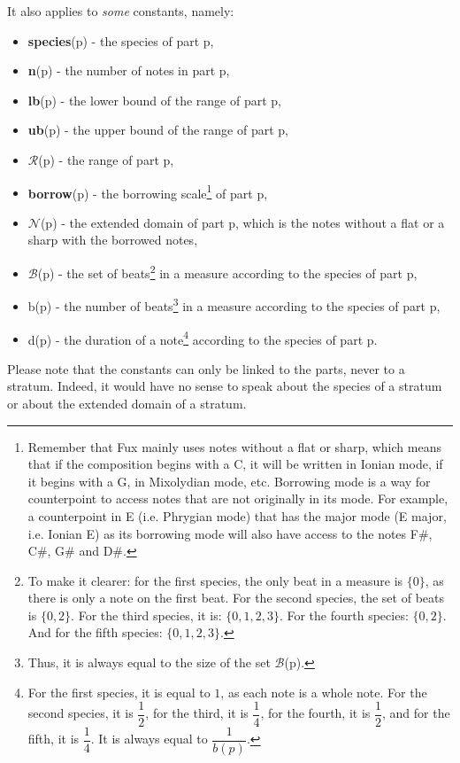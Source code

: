 \noindent It also applies to \textit{some} constants, namely:
\begin{itemize}
    \item \textbf{species}(p) - the species of part p,
    \item \textbf{n}(p) - the number of notes in part p,
    \item \textbf{lb}(p) - the lower bound of the range of part p,
    \item \textbf{ub}(p) - the upper bound of the range of part p,
    \item $\mathcal{R}$(p) - the range of part p,
    \item \textbf{borrow}(p) - the borrowing scale\footnote{Remember that Fux mainly uses notes without a flat or sharp, which means that if the composition begins with a C, it will be written in Ionian mode, if it begins with a G, in Mixolydian mode, etc. Borrowing mode is a way for counterpoint to access notes that are not originally in its mode. For example, a counterpoint in E (i.e. Phrygian mode) that has the major mode (E major, i.e. Ionian E) as its borrowing mode will also have access to the notes F\#, C\#, G\# and D\#.} of part p,
    \item $\mathcal{N}$(p) - the extended domain of part p, which is the notes without a flat or a sharp with the borrowed notes,
    \item $\mathcal{B}$(p) - the set of beats\footnote{To make it clearer: for the first species, the only beat in a measure is $\{0\}$, as there is only a note on the first beat. For the second species, the set of beats is $\{0, 2\}$. For the third species, it is: $\{0, 1, 2, 3\}$. For the fourth species: $\{0, 2\}$. And for the fifth species: $\{0, 1, 2, 3\}$.} in a measure according to the species of part p,
    \item b(p) - the number of beats\footnote{Thus, it is always equal to the size of the set $\mathcal{B}$(p).} in a measure according to the species of part p,
    \item d(p) - the duration of a note\footnote{For the first species, it is equal to $1$, as each note is a whole note. For the second species, it is $\dfrac{1}{2}$, for the third, it is $\dfrac{1}{4}$, for the fourth, it is $\dfrac{1}{2}$, and for the fifth, it is $\dfrac{1}{4}$. It is always equal to $\dfrac{1}{b(p)}$.} according to the species of part p.
\end{itemize}
Please note that the constants can only be linked to the parts, never to a stratum. Indeed, it would have no sense to speak about the species of a stratum or about the extended domain of a stratum.

